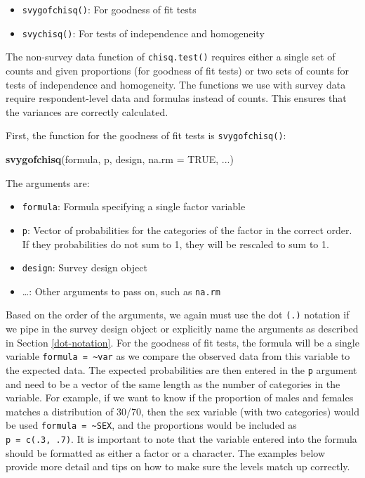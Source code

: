 \documentclass[
]{krantz}
\makeatletter
\newenvironment{Shaded}{\begin{snugshade}}{\end{snugshade}}
\newcommand{\AttributeTok}[1]{\textcolor[rgb]{0.27,0.27,0.27}{#1}}
\newcommand{\ConstantTok}[1]{\textcolor[rgb]{0.37,0.37,0.37}{#1}}
\newcommand{\FunctionTok}[1]{\textcolor[rgb]{0.27,0.27,0.27}{\textbf{#1}}}
\newcommand{\NormalTok}[1]{#1}
\providecommand{\tightlist}{%
  \setlength{\itemsep}{0pt}\setlength{\parskip}{0pt}}
\newenvironment{kframe}{%
\medskip{}
\setlength{\fboxsep}{.8em}
 \def\at@end@of@kframe{}%
 \ifinner\ifhmode%
  \def\at@end@of@kframe{\end{minipage}}%
  \begin{minipage}{\columnwidth}%
 \fi\fi%
 \def\FrameCommand##1{\hskip\@totalleftmargin \hskip-\fboxsep
 \colorbox{shadecolor}{##1}\hskip-\fboxsep
     \hskip-\linewidth \hskip-\@totalleftmargin \hskip\columnwidth}%
 \MakeFramed {\advance\hsize-\width
   \@totalleftmargin\z@ \linewidth\hsize
   \@setminipage}}%
 {\par\unskip\endMakeFramed%
 \at@end@of@kframe}
\renewenvironment{Shaded}{\begin{kframe}}{\end{kframe}}
\makeatother
\begin{document}
\begin{itemize}
\tightlist
\item
  \texttt{svygofchisq()}: For goodness of fit tests
\item
  \texttt{svychisq()}: For tests of independence and homogeneity
\end{itemize}

The non-survey data function of \texttt{chisq.test()} requires either a single set of counts and given proportions (for goodness of fit tests) or two sets of counts for tests of independence and homogeneity. The functions we use with survey data require respondent-level data and formulas instead of counts. This ensures that the variances are correctly calculated.

First, the function for the goodness of fit tests is \texttt{svygofchisq()}:

\begin{Shaded}
\begin{Highlighting}[]
\FunctionTok{svygofchisq}\NormalTok{(formula,}
\NormalTok{            p,}
\NormalTok{            design,}
            \AttributeTok{na.rm =} \ConstantTok{TRUE}\NormalTok{,}
\NormalTok{            ...)}
\end{Highlighting}
\end{Shaded}

The arguments are:

\begin{itemize}
\tightlist
\item
  \texttt{formula}: Formula specifying a single factor variable
\item
  \texttt{p}: Vector of probabilities for the categories of the factor in the correct order. If they probabilities do not sum to 1, they will be rescaled to sum to 1.
\item
  \texttt{design}: Survey design object
\item
  \ldots: Other arguments to pass on, such as \texttt{na.rm}
\end{itemize}

Based on the order of the arguments, we again must use the dot \texttt{(.)} notation if we pipe in the survey design object or explicitly name the arguments as described in Section \ref{dot-notation}. For the goodness of fit tests, the formula will be a single variable \texttt{formula\ =\ \textasciitilde{}var} as we compare the observed data from this variable to the expected data. The expected probabilities are then entered in the \texttt{p} argument and need to be a vector of the same length as the number of categories in the variable. For example, if we want to know if the proportion of males and females matches a distribution of 30/70, then the sex variable (with two categories) would be used \texttt{formula\ =\ \textasciitilde{}SEX}, and the proportions would be included as \texttt{p\ =\ c(.3,\ .7)}. It is important to note that the variable entered into the formula should be formatted as either a factor or a character. The examples below provide more detail and tips on how to make sure the levels match up correctly.
\end{document}
